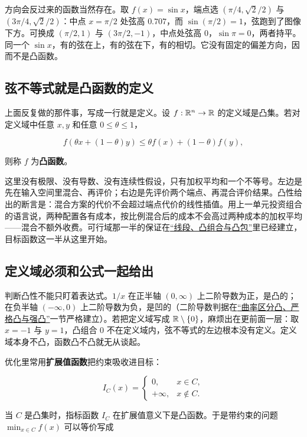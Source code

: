 方向会反过来的函数当然存在。取 \(f(x)=\sin x\)，端点选 \((\pi/4,\sqrt2/2)\) 与 \((3\pi/4,\sqrt2/2)\)：中点 \(x=\pi/2\) 处弦高 \(0.707\)，而 \(\sin(\pi/2)=1\)，弦跑到了图像下方。可换成 \((\pi/2,1)\) 与 \((3\pi/2,-1)\)，中点处弦高 \(0\)，\(\sin\pi=0\)，两者持平。同一个 \(\sin x\)，有的弦在上，有的弦在下，有的相切。它没有固定的偏差方向，因而不是凸函数。

\subsection{弦不等式就是凸函数的定义}

上面反复做的那件事，写成一行就是定义。设 \(f:\mathbb{R}^n\to\mathbb{R}\) 的定义域是凸集。若对定义域中任意 \(x,y\) 和任意 \(0\le\theta\le1\)，

\[
f(\theta x+(1-\theta)y)
\le
\theta f(x)+(1-\theta)f(y),
\]

则称 \(f\) 为\textbf{凸函数}。

这里没有极限、没有导数、没有连续性假设，只有加权平均和一个不等号。左边是先在输入空间里混合、再评价；右边是先评价两个端点、再混合评价结果。凸性给出的断言是：混合方案的代价不会超过端点代价的线性插值。用上一单元投资组合的语言说，两种配置各有成本，按比例混合后的成本不会高过两种成本的加权平均——混合不额外收费。可行域那一半的保证在\hyperref[sec:09-Convex-Optimization/02-Convex-Sets/01]{``线段、凸组合与凸包''}里已经建立，目标函数这一半从这里开始。

\subsection{定义域必须和公式一起给出}

判断凸性不能只盯着表达式。\(1/x\) 在正半轴 \((0,\infty)\) 上二阶导数为正，是凸的；在负半轴 \((-\infty,0)\) 上二阶导数为负，是凹的（二阶导数判据在\hyperref[sec:09-Convex-Optimization/03-Convex-Functions/03]{``曲率区分凸、严格凸与强凸''}一节严格建立）。若把定义域写成 \(\mathbb{R}\setminus\{0\}\)，麻烦出在更前面一层：取 \(x=-1\) 与 \(y=1\)，凸组合 \(0\) 不在定义域内，弦不等式的左边根本没有定义。定义域本身不凸，函数凸不凸就无从谈起。

优化里常用\textbf{扩展值函数}把约束吸收进目标：

\[
I_C(x)=
\begin{cases}
0,&x\in C,\\
+\infty,&x\notin C.
\end{cases}
\]

当 \(C\) 是凸集时，指标函数 \(I_C\) 在扩展值意义下是凸函数。于是带约束的问题 \(\min_{x\in C}f(x)\) 可以等价写成

